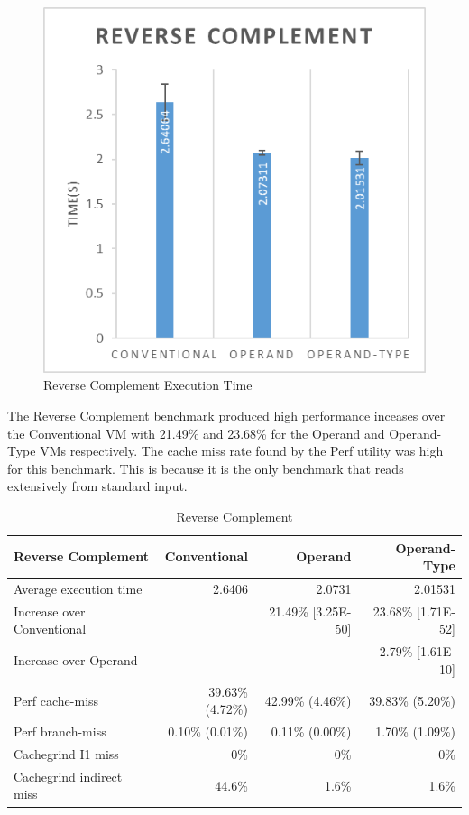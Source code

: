 \documentclass[english,a4paper,12pt]{report}
\begin{document}
\begin{figure}[!htb]
  \centering
  \includegraphics{reversecomplement.png}
  \caption{Reverse Complement Execution Time}
  \label{fig:reverse-time}
\end{figure}

The Reverse Complement benchmark produced high performance inceases
over the Conventional VM with 21.49\% and 23.68\% for the Operand and
Operand-Type VMs respectively. The cache miss rate found by the Perf
utility was high for this benchmark. This is because it is the only
benchmark that reads extensively from standard input. 

\begin{table}[!htb]
  \begin{center}
    \begin{tabular}{lrrr}
      Reverse Complement & Conventional & Operand & Operand-Type\\
      \hline
      Average execution time & 2.6406 & 2.0731 & 2.01531\\
      Increase over Conventional &  & 21.49\% [3.25E-50] & 23.68\% [1.71E-52]\\
      Increase over Operand &  &  & 2.79\% [1.61E-10]\\
      Perf cache-miss & 39.63\% (4.72\%) & 42.99\% (4.46\%) & 39.83\% (5.20\%)\\
      Perf branch-miss & 0.10\% (0.01\%) & 0.11\% (0.00\%) & 1.70\% (1.09\%)\\
      Cachegrind I1 miss & 0\% & 0\% & 0\%\\
      Cachegrind indirect miss & 44.6\% & 1.6\% & 1.6\%\\
    \end{tabular}
  \end{center}
  \caption{Reverse Complement}
\end{table}
\end{document}
